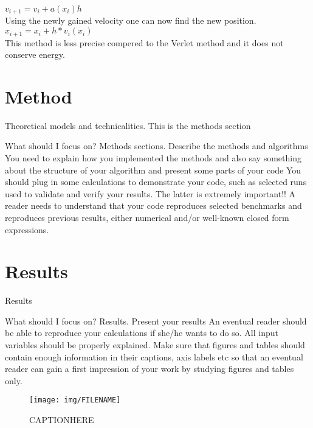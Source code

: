 \documentclass{article}
\begin{document}
    $v_{i+1} = v_i +  a(x_i)h$ \\

    Using the newly gained velocity one can now find the new position. \\

    $x_{i+1} = x_i +  h*v_{i}(x_i) $ \\

    This method is less precise compered to the Verlet method and it does not conserve energy. \\


\vspace{1cm}

\section{Method} \label{sec:Method}

Theoretical models and technicalities. This is the methods section


What should I focus on? Methods sections.
Describe the methods and algorithms
You need to explain how you implemented the methods and also say something about the structure of your algorithm and present some parts of your code
You should plug in some calculations to demonstrate your code, such as selected runs used to validate and verify your results. The latter is extremely important!! A reader needs to understand that your code reproduces selected benchmarks and reproduces previous results, either numerical and/or well-known closed form expressions.

\vspace{1cm}

\section{Results} \label{sec:Results}

Results

What should I focus on? Results.
Present your results
An eventual reader should be able to reproduce your calculations if she/he wants to do so. All input variables should be properly explained.
Make sure that figures and tables should contain enough information in their captions, axis labels etc so that an eventual reader can gain a first impression of your work by studying figures and tables only.

\iffalse
  \begin{figure}[H]
      \centering
      \texttt{[image: img/FILENAME]}
      \caption{CAPTIONHERE}
      \label{fig:LABELHERE}
    \end{figure}
\end{document}
